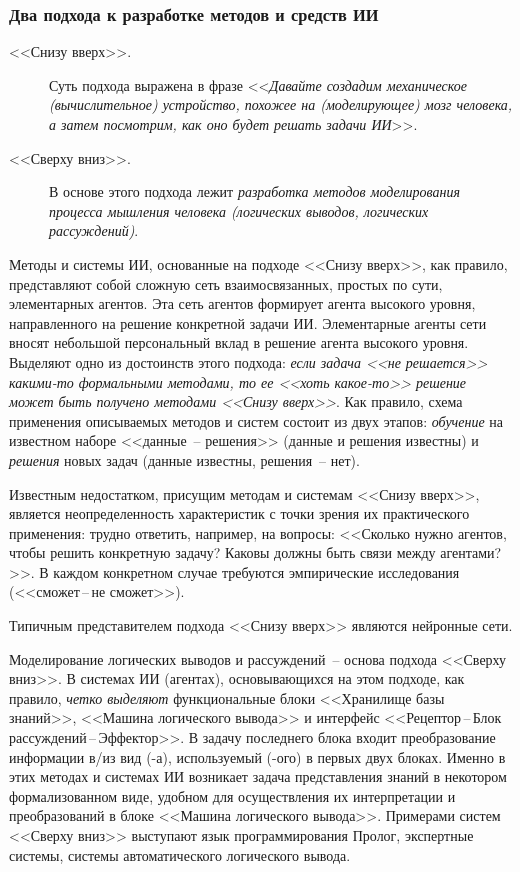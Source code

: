 \documentclass[a4paper,14pt, openany, twoside, draft]{extbook} %
\begin{document}
\subsubsection*{Два подхода к разработке методов и средств ИИ}
\begin{mygroup}
\begin{description}
\item[<<Снизу вверх>>.] Суть подхода выражена в фразе <<{\em Давайте создадим механическое (вычислительное) устройство, похожее на (моделирующее) мозг человека, а затем посмотрим, как оно будет решать задачи ИИ}>>.
\item[<<Сверху вниз>>.] В основе этого подхода лежит {\em разработка методов моделирования процесса мышления человека (логических выводов, логических рассуждений)}.
\end{description}

Методы и системы ИИ, основанные на подходе <<Снизу вверх>>, как правило, представляют собой сложную сеть взаимосвязанных, простых по сути, элементарных агентов. Эта сеть агентов формирует агента высокого уровня, направленного на решение конкретной задачи ИИ. Элементарные агенты сети вносят небольшой персональный вклад в решение агента высокого уровня. Выделяют одно из достоинств этого подхода: {\em если задача <<не решается>> какими-то формальными методами, то ее <<хоть какое-то>> решение может быть получено методами <<Снизу вверх>>}. Как правило, схема применения описываемых методов и систем состоит из двух этапов: {\em обучение} на известном наборе <<данные~-- решения>> (данные и решения известны) и {\em решения} новых задач (данные известны, решения~-- нет).

Известным недостатком, присущим методам и системам <<Снизу вверх>>, является неопределенность характеристик с точки зрения их практического применения: трудно ответить, например, на вопросы: <<Сколько нужно агентов, чтобы решить конкретную задачу? Каковы должны быть связи между агентами?>>. В каждом конкретном случае требуются эмпирические исследования (<<сможет\,{}--\,{}не сможет>>).

Типичным представителем подхода <<Снизу вверх>> являются нейронные сети.

Моделирование логических выводов и рассуждений~-- основа подхода <<Сверху вниз>>. В системах ИИ (агентах), основывающихся на этом подходе, как правило, {\em четко выделяют} функциональные блоки <<Хранилище базы знаний>>, <<Машина логического вывода>> и интерфейс <<Рецептор\,{}--\,{}Блок  рассуждений\,{}--\,{}Эффектор>>. В задачу последнего блока входит преобразование информации в/из вид (-а), используемый (-ого) в первых двух блоках. Именно в этих методах и системах ИИ возникает задача представления знаний в некотором формализованном виде, удобном для осуществления их интерпретации и преобразований в блоке <<Машина логического вывода>>. Примерами систем <<Сверху вниз>> выступают язык программирования Пролог, экспертные системы, системы автоматического логического вывода.
\end{mygroup}
\end{document}
